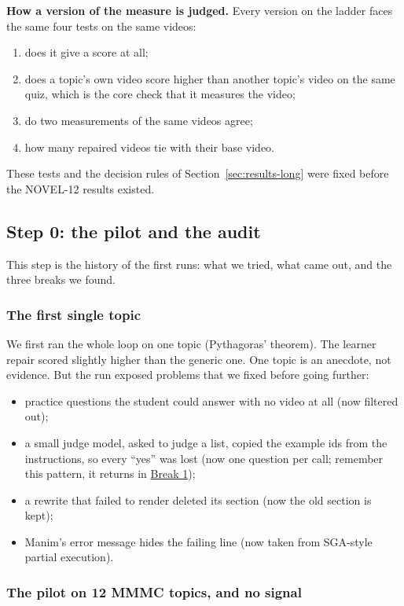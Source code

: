 \documentclass[11pt]{article}
\begin{document}
\textbf{How a version of the measure is judged.} Every version on the ladder faces the same four tests on the same
videos:
\begin{enumerate}
  \item does it give a score at all;
  \item does a topic's own video score higher than another topic's video on the same quiz, which is the core check
  that it measures the video;
  \item do two measurements of the same videos agree;
  \item how many repaired videos tie with their base video.
\end{enumerate}
These tests and the decision rules of Section~\ref{sec:results-long} were fixed before the NOVEL-12 results existed.

\DiagStudy

\subsection{Step 0: the pilot and the audit}

This step is the history of the first runs: what we tried, what came out, and the three breaks we found.

\subsubsection*{The first single topic}

We first ran the whole loop on one topic (Pythagoras' theorem). The learner repair scored slightly higher than the
generic one. One topic is an anecdote, not evidence. But the run exposed problems that we fixed before going further:
\begin{itemize}
  \item practice questions the student could answer with no video at all (now filtered out);
  \item a small judge model, asked to judge a list, copied the example ids from the instructions, so every ``yes'' was
  lost (now one question per call; remember this pattern, it returns in \hyperref[sec:idbug]{Break 1});
  \item a rewrite that failed to render deleted its section (now the old section is kept);
  \item Manim's error message hides the failing line (now taken from SGA-style partial execution).
\end{itemize}

\subsubsection*{The pilot on 12 MMMC topics, and no signal}
\end{document}

